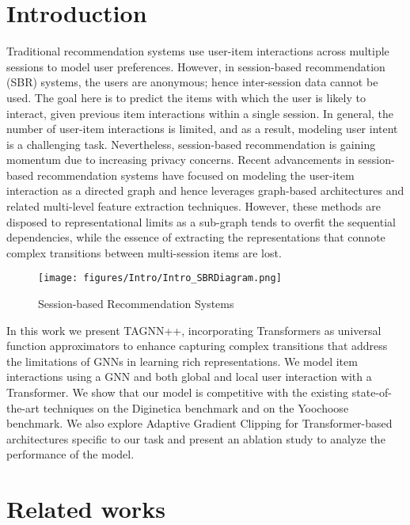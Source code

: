 \documentclass[conference]{IEEEtran}
\begin{document}
\section{Introduction}
Traditional recommendation systems use user-item interactions across multiple sessions to model user preferences. However, in session-based recommendation (SBR) systems, the users are anonymous; hence inter-session data cannot be used. The goal here is to predict the items with which the user is likely to interact, given previous item interactions within a single session. In general, the number of user-item interactions is limited, and as a result, modeling user intent is a challenging task. Nevertheless, session-based recommendation is gaining momentum due to increasing privacy concerns. Recent advancements in session-based recommendation systems have focused on modeling the user-item interaction as a directed graph and hence leverages graph-based architectures and related multi-level feature extraction techniques. However, these methods are disposed to representational limits \cite{garg2020generalization} as a sub-graph tends to overfit the sequential dependencies, while the essence of extracting the representations that connote complex transitions between multi-session items are lost.

\begin{figure}[!t]
    \centering
    \texttt{[image: figures/Intro/Intro\_SBRDiagram.png]}
    \caption{Session-based Recommendation Systems}
    \label{task}
\end{figure}

In this work we present TAGNN++, incorporating Transformers as universal function approximators to enhance capturing complex transitions that address the limitations of GNNs in learning rich representations. We model item interactions using a GNN and both global and local user interaction with a Transformer. We show that our model is competitive with the existing state-of-the-art techniques on the Diginetica benchmark and on the Yoochoose benchmark. We also explore Adaptive Gradient Clipping \cite{brock2021high} for Transformer-based architectures specific to our task and present an ablation study to analyze the performance of the model.



\section{Related works}
\end{document}
